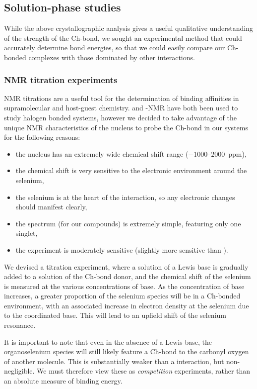 \begin{refsection}
\subsection{Solution-phase studies}
While the above crystallographic analysis gives a useful qualitative understanding of the strength of the Ch-bond, we sought an experimental method that could accurately determine bond energies, so that we could easily compare our Ch-bonded complexes with those dominated by other interactions.

\subsubsection{NMR titration experiments}
NMR titrations are a useful tool for the determination of binding affinities in supra\-molecular and host-guest chemistry.\autocite{Foyle2020,Gilday2013,Garrett2015a,Sarwar2010}
 and -NMR have both been used to study halogen bonded systems, however we decided to take advantage of the unique NMR characteristics of the  nucleus to probe the Ch-bond in our systems for the following reasons:

\begin{itemize}
    \item the nucleus has an extremely wide chemical shift range ($-1000\text{--}2000$~ppm),
    \item the chemical shift is very sensitive to the electronic environment around the selenium,
    \item the selenium is at the heart of the interaction, so any electronic changes should manifest clearly,
    \item the spectrum (for our compounds) is extremely simple, featuring only one singlet,
    \item the experiment is moderately sensitive (slightly more sensitive than ).
\end{itemize}

We devised a titration experiment, where a solution of a Lewis base is gradually added to a solution of the Ch-bond donor, and the chemical shift of the selenium is measured at the various concentrations of base.
As the concentration of base increases, a greater proportion of the selenium species will be in a Ch-bonded environment, with an associated increase in electron density at the selenium due to the coordinated base.
This will lead to an upfield shift of the selenium resonance.

It is important to note that even in the absence of a Lewis base, the organoselenium species will still likely feature a Ch-bond to the carbonyl oxygen of another molecule.
This is substantially weaker than a  interaction, but non-negligible.
We must therefore view these as \emph{competition} experiments, rather than an absolute measure of binding energy.


\end{refsection}
